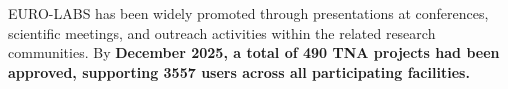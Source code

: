 \begin{itemize}
EURO-LABS has been widely promoted through presentations at conferences, scientific meetings, and outreach activities within the related research communities. By \textbf{December 2025, a total of 490 TNA projects had been approved, supporting 3557 users across all participating facilities.}




\end{itemize}
